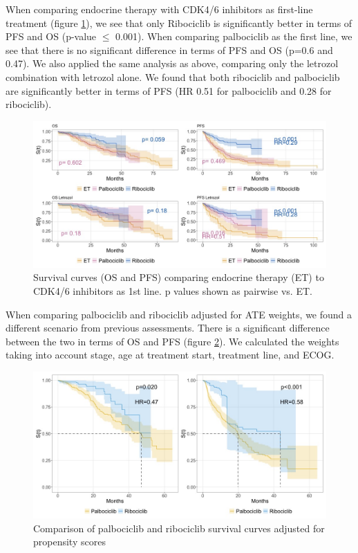 When comparing endocrine therapy with CDK4/6 inhibitors as first-line treatment (figure \ref*{fig:grouped}), we see that only Ribociclib is significantly better in terms of PFS and OS (p-value $\le$ 0.001). When comparing palbociclib as the first line, we see that there is no significant difference in terms of PFS and OS (p=0.6 and 0.47).
We also applied the same analysis as above, comparing only the letrozol combination with letrozol alone. We found that both ribociclib and palbociclib are significantly better in terms of PFS (HR 0.51 for palbociclib and 0.28 for ribociclib).
\begin{figure}[ht]
  \centering

  \caption{Survival curves (OS and PFS) comparing endocrine therapy (ET) to CDK4/6 inhibitors as 1st line. p values shown as pairwise vs. ET. }\label{fig:grouped} 
  \includegraphics[scale=0.42]{figures/grouped_curve_both.jpeg}%

\end{figure}

When comparing palbociclib and ribociclib adjusted for ATE weights, we found a different scenario from previous assessments. There is a significant difference between the two in terms of OS and PFS (figure \ref*{fig:propensity}). We calculated the weights taking into account stage, age at treatment start, treatment line, and ECOG.

\begin{figure}[ht]
  \centering

  \caption{Comparison of palbociclib and ribociclib survival curves adjusted for propensity scores  }\label{fig:propensity} 
  \includegraphics[scale=0.42]{figures/propensity_score_both.jpeg}%

\end{figure}


